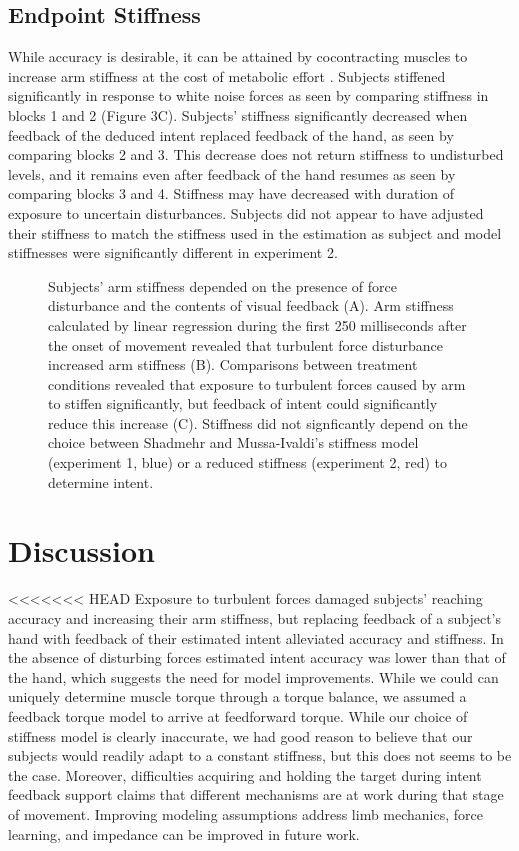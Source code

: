 \documentclass[letterpaper, 10 pt, conference]{ieeeconf}  %
\begin{document}
\subsection*{Endpoint Stiffness}
While accuracy is desirable, it can be attained by cocontracting muscles to increase arm stiffness at the cost of metabolic effort \cite{gribble2003role}\cite{takahashi2001impedance}. Subjects stiffened significantly in response to white noise forces as seen by comparing stiffness in blocks 1 and 2 (Figure 3C). Subjects' stiffness significantly decreased when feedback of the deduced intent replaced feedback of the hand, as seen by comparing blocks 2 and 3. This decrease does not return stiffness to undisturbed levels, and it remains even after feedback of the hand resumes as seen by comparing blocks 3 and 4. Stiffness may have decreased with duration of exposure to uncertain disturbances\cite{takahashi2001impedance}. Subjects did not appear to have adjusted their stiffness to match the stiffness used in the estimation as subject and model stiffnesses were significantly different in experiment 2.

\begin{figure}[t]
\centering
{}
\caption{Subjects' arm stiffness depended on the presence of force disturbance and the contents of visual feedback (A). Arm stiffness calculated by linear regression during the first 250 milliseconds after the onset of movement revealed that turbulent force disturbance increased arm stiffness (B). Comparisons between treatment conditions revealed that exposure to turbulent forces caused by arm to stiffen significantly, but feedback of intent could significantly reduce this increase (C). Stiffness did not signficantly depend on the choice between Shadmehr and Mussa-Ivaldi's\cite{shadmehr1994adaptive} stiffness model (experiment 1, blue) or a reduced stiffness (experiment 2, red) to determine intent.}
\label{stiffness}
\end{figure}

\section{Discussion}
<<<<<<< HEAD
Exposure to turbulent forces damaged subjects' reaching accuracy and increasing their arm stiffness, but replacing feedback of a subject's hand with feedback of their estimated intent alleviated accuracy and stiffness. In the absence of disturbing forces estimated intent accuracy was lower than that of the hand, which suggests the need for model improvements. While we could can uniquely determine muscle torque through a torque balance, we assumed a feedback torque model to arrive at feedforward torque. While our choice of stiffness model is clearly inaccurate, we had good reason to believe that our subjects would readily adapt to a constant stiffness, but this does not seems to be the case. Moreover, difficulties acquiring and holding the target during intent feedback support claims that different mechanisms are at work during that stage of movement\cite{niu2010temporal}. Improving modeling assumptions address limb mechanics, force learning, and impedance can be improved in future work.
\end{document}
